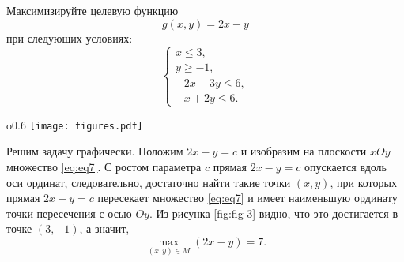 

 Максимизируйте целевую функцию
\[ g(x, y)=2x-y \]
при следующих условиях:
\begin{equation} \label{eq:eq7}\tag{M}
\begin{cases}
x \le 3,\\
y \ge -1,\\
-2x-3y \le 6,\\
-x+2y \le 6.
\end{cases}
\end{equation}

\begin{wrapfigure}{o}{0.6\textwidth}
\centering
\texttt{[image: figures.pdf]}
\caption{Графическое решение задачи}
\label{fig:fig-3}
\end{wrapfigure}


Решим задачу графически. Положим $2x-y=c$ и изобразим на плоскости $xOy$ множество \ref{eq:eq7}. С ростом параметра $c$ прямая $2x-y=c$ опускается вдоль оси ординат, следовательно, достаточно найти такие точки $(x, y)$, при которых прямая $2x-y=c$ пересекает множество \ref{eq:eq7} и имеет наименьшую ординату точки пересечения с осью $Oy$. Из рисунка \ref{fig:fig-3} видно, что это достигается в точке $(3, -1)$, а значит, 
\[
\max_{(x, y) \in M}(2x-y) = 7.
\]

































